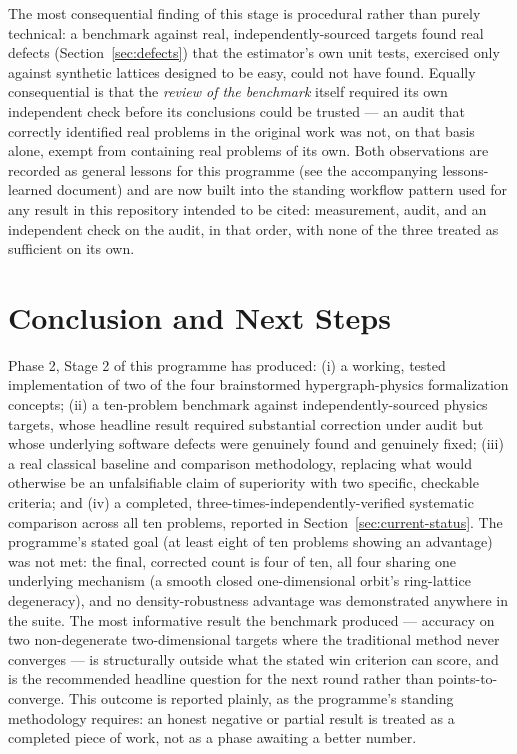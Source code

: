 \documentclass[11pt,a4paper]{article}
\begin{document}
The most consequential finding of this stage is procedural rather than
purely technical: a benchmark against real, independently-sourced targets
found real defects (Section~\ref{sec:defects}) that the estimator's own
unit tests, exercised only against synthetic lattices designed to be easy,
could not have found. Equally consequential is that the \emph{review of
the benchmark} itself required its own independent check before its
conclusions could be trusted --- an audit that correctly identified real
problems in the original work was not, on that basis alone, exempt from
containing real problems of its own. Both observations are recorded as
general lessons for this programme (see the accompanying lessons-learned
document) and are now built into the standing workflow pattern used for
any result in this repository intended to be cited: measurement, audit,
and an independent check on the audit, in that order, with none of the
three treated as sufficient on its own.

\section{Conclusion and Next Steps}

Phase 2, Stage 2 of this programme has produced: (i) a working, tested
implementation of two of the four brainstormed hypergraph-physics
formalization concepts; (ii) a ten-problem benchmark against
independently-sourced physics targets, whose headline result required
substantial correction under audit but whose underlying software defects
were genuinely found and genuinely fixed; (iii) a real classical baseline
and comparison methodology, replacing what would otherwise be an
unfalsifiable claim of superiority with two specific, checkable criteria;
and (iv) a completed, three-times-independently-verified systematic
comparison across all ten problems, reported in
Section~\ref{sec:current-status}. The programme's stated goal (at least
eight of ten problems showing an advantage) was not met: the final,
corrected count is four of ten, all four sharing one underlying mechanism
(a smooth closed one-dimensional orbit's ring-lattice degeneracy), and no
density-robustness advantage was demonstrated anywhere in the suite. The
most informative result the benchmark produced --- accuracy on two
non-degenerate two-dimensional targets where the traditional method never
converges --- is structurally outside what the stated win criterion can
score, and is the recommended headline question for the next round rather
than points-to-converge. This outcome is reported plainly, as the
programme's standing methodology requires: an honest negative or partial
result is treated as a completed piece of work, not as a phase awaiting a
better number.
\end{document}
